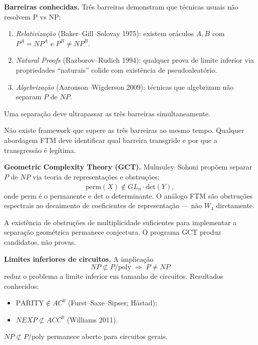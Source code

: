 \documentclass[11pt,a4paper]{article}
\begin{document}
\begin{programs}

\item \textbf{Barreiras conhecidas.}
Três barreiras demonstram que técnicas usuais não resolvem P vs NP:
\begin{enumerate}[label=(\roman*),leftmargin=2em]
  \item \emph{Relativização} (Baker–Gill–Solovay 1975):
    existem oráculos $A,B$ com $P^A=NP^A$ e $P^B\neq NP^B$.
  \item \emph{Natural Proofs} (Razborov–Rudich 1994):
    qualquer prova de limite inferior via propriedades ``naturais''
    colide com existência de pseudoaleatório.
  \item \emph{Algebrização} (Aaronson–Wigderson 2009):
    técnicas que algebrizam não separam $P$ de $NP$.
\end{enumerate}
Uma separação deve ultrapassar as três barreiras simultaneamente.

\begin{gap}
Não existe framework que supere as três barreiras ao mesmo tempo.
Qualquer abordagem FTM deve identificar qual barreira transgride
e por que a transgressão é legítima. \OPEN
\end{gap}

\item \textbf{Geometric Complexity Theory (GCT).}
Mulmuley–Sohoni propõem separar $P$ de $NP$ via teoria de
representações e obstruções:
\[
  \mathrm{perm}(X)\notin\overline{GL_n\cdot\mathrm{det}(Y)},
\]
onde $\mathrm{perm}$ é o permanente e $\mathrm{det}$ o determinante.
O análogo FTM são obstruções espectrais ao decaimento de
coeficientes de representação — não $W_4$ diretamente.

\begin{gap}
A existência de obstruções de multiplicidade suficientes para
implementar a separação geométrica permanece conjectura.
O programa GCT produz candidatos, não provas. \OPEN
\end{gap}

\item \textbf{Limites inferiores de circuitos.}
A implicação
\[
  NP\not\subset P/\mathrm{poly}
  \;\Longrightarrow\;
  P\neq NP
\]
reduz o problema a limite inferior em tamanho de circuitos.
Resultados conhecidos:
\begin{itemize}[leftmargin=2em]
  \item $\mathrm{PARITY}\notin AC^0$ (Furst–Saxe–Sipser; Håstad);
  \item $NEXP\not\subset ACC^0$ (Williams 2011).
\end{itemize}
$NP\not\subset P/\mathrm{poly}$ permanece aberto para circuitos gerais.


\end{programs}
\end{document}
